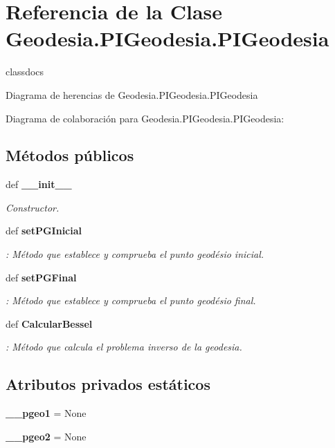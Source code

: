 \section{Referencia de la Clase Geodesia.\-P\-I\-Geodesia.\-P\-I\-Geodesia}
\label{classGeodesia_1_1PIGeodesia_1_1PIGeodesia}


classdocs  




Diagrama de herencias de Geodesia.\-P\-I\-Geodesia.\-P\-I\-Geodesia


Diagrama de colaboración para Geodesia.\-P\-I\-Geodesia.\-P\-I\-Geodesia\-:
\subsection*{Métodos públicos}
\begin{DoxyCompactItemize}
\item 
def {\bf \-\_\-\-\_\-init\-\_\-\-\_\-}
\begin{DoxyCompactList}\small\item\em Constructor. \end{DoxyCompactList}\item 
def {\bf set\-P\-G\-Inicial}
\begin{DoxyCompactList}\small\item\em \-: Método que establece y comprueba el punto geodésio inicial. \end{DoxyCompactList}\item 
def {\bf set\-P\-G\-Final}
\begin{DoxyCompactList}\small\item\em \-: Método que establece y comprueba el punto geodésio final. \end{DoxyCompactList}\item 
def {\bf Calcular\-Bessel}
\begin{DoxyCompactList}\small\item\em \-: Método que calcula el problema inverso de la geodesia. \end{DoxyCompactList}\end{DoxyCompactItemize}
\subsection*{Atributos privados estáticos}
\begin{DoxyCompactItemize}
\item 
{\bf \-\_\-\-\_\-pgeo1} = None
\item 
{\bf \-\_\-\-\_\-pgeo2} = None
\end{DoxyCompactItemize}


